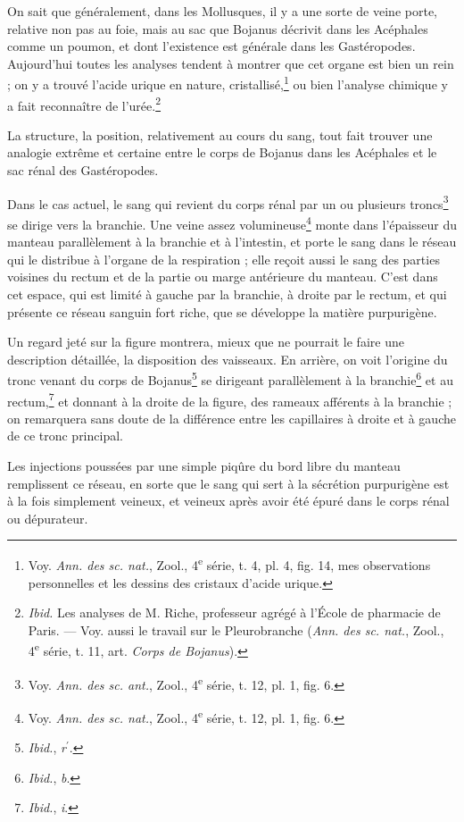 \documentclass[a4paper, 11pt, oneside, polutonikogreek, french]{article}
\begin{document}
On sait que généralement, dans les Mollusques, il y a une sorte de veine porte, relative non pas au foie, mais au sac que Bojanus décrivit dans les Acéphales comme un poumon, et dont l'existence est générale dans les Gastéropodes. Aujourd'hui toutes les analyses tendent à montrer que cet organe est bien un rein ; on y a trouvé l'acide urique en nature, cristallisé,\footnote{Voy. \emph{Ann. des sc. nat.}, Zool., 4\textsuperscript{e} série, t. 4, pl. 4, fig. 14, mes observations personnelles et les dessins des cristaux d'acide urique.} ou bien l'analyse chimique y a fait reconnaître de l'urée.\footnote{\emph{Ibid.} Les analyses de M. Riche, professeur agrégé à l'École de pharmacie de Paris. --- Voy. aussi le travail sur le Pleurobranche (\emph{Ann. des sc. nat.}, Zool., 4\textsuperscript{e} série, t. 11, art. \emph{Corps de Bojanus}).}

La structure, la position, relativement au cours du sang, tout fait trouver une analogie extrême et certaine entre le corps de Bojanus dans les Acéphales et le sac rénal des Gastéropodes.

Dans le cas actuel, le sang qui revient du corps rénal par un ou plusieurs troncs\footnote{Voy. \emph{Ann. des sc. ant.}, Zool., 4\textsuperscript{e} série, t. 12, pl. 1, fig. 6.} se dirige vers la branchie. Une veine assez volumineuse\footnote{Voy. \emph{Ann. des sc. nat.}, Zool., 4\textsuperscript{e} série, t. 12, pl. 1, fig. 6.} monte dans l'épaisseur du manteau parallèlement à la branchie et à l'intestin, et porte le sang dans le réseau qui le distribue à l'organe de la respiration ; elle reçoit aussi le sang des parties voisines du rectum et de la partie ou marge antérieure du manteau. C'est dans cet espace, qui est limité à gauche par la branchie, à droite par le rectum, et qui présente ce réseau sanguin fort riche, que se développe la matière purpurigène.

Un regard jeté sur la figure montrera, mieux que ne pourrait le faire une description détaillée, la disposition des vaisseaux. En arrière, on voit l'origine du tronc venant du corps de Bojanus\footnote{\emph{Ibid.}, \emph{r}$^\prime$.} se dirigeant parallèlement à la branchie\footnote{\emph{Ibid.}, \emph{b}.} et au rectum,\footnote{\emph{Ibid.}, \emph{i}.} et donnant à la droite de la figure, des rameaux afférents à la branchie ; on remarquera sans doute de la différence entre les capillaires à droite et à gauche de ce tronc principal.

Les injections poussées par une simple piqûre du bord libre du manteau remplissent ce réseau, en sorte que le sang qui sert à la sécrétion purpurigène est à la fois simplement veineux, et veineux après avoir été épuré dans le corps rénal ou dépurateur.
\end{document}
